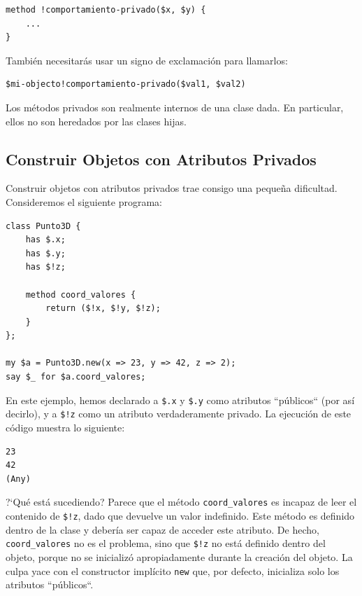 \begin{lstlisting}
method !comportamiento-privado($x, $y) {
    ...
}
\end{lstlisting}

También necesitarás usar un signo de exclamación para llamarlos:

\begin{lstlisting}
$mi-objecto!comportamiento-privado($val1, $val2)
\end{lstlisting}

Los métodos privados son realmente internos de una clase 
dada. En particular, ellos no son heredados por las clases hijas.


\subsection{Construir Objetos con Atributos Privados}

Construir objetos con atributos privados trae consigo una
pequeña dificultad. Consideremos el siguiente programa:

\begin{lstlisting}
class Punto3D {
    has $.x;
    has $.y;
    has $!z;
    
    method coord_valores {
        return ($!x, $!y, $!z);
    }
};

my $a = Punto3D.new(x => 23, y => 42, z => 2);
say $_ for $a.coord_valores;
\end{lstlisting}

En este ejemplo, hemos declarado a \verb|$.x| y \verb|$.y|
como atributos ``públicos`` (por así decirlo), y a \verb|$!z|
como un atributo verdaderamente privado. La ejecución de 
este código muestra lo siguiente:

\begin{lstlisting}
23
42
(Any)
\end{lstlisting}

?`Qué está sucediendo? Parece que el método \verb|coord_valores|
es incapaz de leer el contenido de \verb|$!z|, dado que 
devuelve un valor indefinido. Este método es definido dentro
de la clase y debería ser capaz de acceder este atributo. De hecho,
\verb|coord_valores| no es el problema, sino que \verb|$!z| no está
definido dentro del objeto, porque no se inicializó apropiadamente
durante la creación del objeto.
La culpa yace con el constructor implícito {\tt new} que, por
defecto, inicializa solo los atributos ``públicos``.


